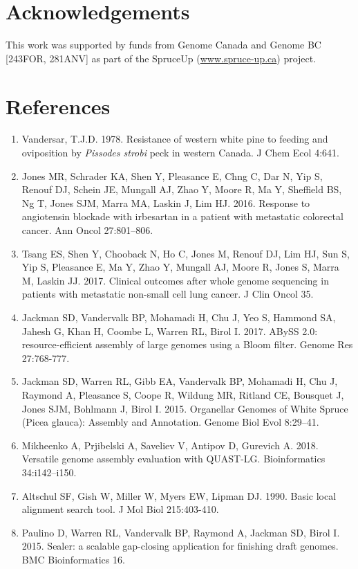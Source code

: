 \documentclass[titlepage,11pt, oneside]{article}   	%
\begin{document}
\section*{Acknowledgements}
This work was supported by funds from Genome Canada and Genome BC [243FOR, 281ANV] as part of the SpruceUp (\url{www.spruce-up.ca}) project.
\section*{References}
\begin{enumerate}
\item Vandersar, T.J.D. 1978. Resistance of western white pine to feeding and oviposition by \textit{Pissodes strobi} peck in western Canada. J Chem Ecol 4:641.
\item Jones MR, Schrader KA, Shen Y, Pleasance E, Chng C, Dar N, Yip S, Renouf DJ, Schein JE, Mungall AJ, Zhao Y, Moore R, Ma Y, Sheffield BS, Ng T, Jones SJM, Marra MA, Laskin J, Lim HJ. 2016. Response to angiotensin blockade with irbesartan in a patient with metastatic colorectal cancer. Ann Oncol 27:801–806.
\item Tsang ES, Shen Y, Chooback N, Ho C, Jones M, Renouf DJ, Lim HJ, Sun S, Yip S, Pleasance E, Ma Y, Zhao Y, Mungall AJ, Moore R, Jones S, Marra M, Laskin JJ. 2017. Clinical outcomes after whole genome sequencing in patients with metastatic non-small cell lung cancer. J Clin Oncol 35.
\item Jackman SD, Vandervalk BP, Mohamadi H, Chu J, Yeo S, Hammond SA, Jahesh G, Khan H, Coombe L, Warren RL, Birol I. 2017. ABySS 2.0: resource-efficient assembly of large genomes using a Bloom filter. Genome Res 27:768-777.
\item Jackman SD, Warren RL, Gibb EA, Vandervalk BP, Mohamadi H, Chu J, Raymond A, Pleasance S, Coope R, Wildung MR, Ritland CE, Bousquet J, Jones SJM, Bohlmann J, Birol I. 2015. Organellar Genomes of White Spruce (Picea glauca): Assembly and Annotation. Genome Biol Evol 8:29–41.
\item Mikheenko A, Prjibelski A, Saveliev V, Antipov D, Gurevich A. 2018. Versatile genome assembly evaluation with QUAST-LG. Bioinformatics 34:i142–i150.
\item Altschul SF, Gish W, Miller W, Myers EW, Lipman DJ. 1990. Basic local alignment search tool. J Mol Biol 215:403-410.
\item Paulino D, Warren RL, Vandervalk BP, Raymond A, Jackman SD, Birol I. 2015. Sealer: a scalable gap-closing application for finishing draft genomes. BMC Bioinformatics 16.

\end{enumerate}
\end{document}
